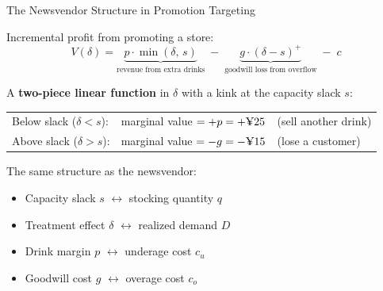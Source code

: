 \documentclass[aspectratio=169, 11pt, handout]{beamer}
\begin{document}
 
\begin{frame}{The Newsvendor Structure in Promotion Targeting}
 
Incremental profit from promoting a store:
\[
V(\delta) = \underbrace{p \cdot \min(\delta,\, s)}_{\text{revenue from extra drinks}} \;-\; \underbrace{g \cdot (\delta - s)^+}_{\text{goodwill loss from overflow}} \;-\; c
\]
 
\pause
\bigskip
 
A \textbf{two-piece linear function} in $\delta$ with a kink at the capacity slack $s$:
 
\medskip
 
\begin{center}
\begin{tabular}{lcl}
Below slack ($\delta < s$): & marginal value $= +p = +\text{\textyen}25$ & (sell another drink) \\
Above slack ($\delta > s$): & marginal value $= -g = -\text{\textyen}15$ & (lose a customer) \\
\end{tabular}
\end{center}
 
\pause
\bigskip
 
The same structure as the newsvendor:
\begin{itemize}
    \item Capacity slack $s$ $\longleftrightarrow$ stocking quantity $q$
    \item Treatment effect $\delta$ $\longleftrightarrow$ realized demand $D$
    \item Drink margin $p$ $\longleftrightarrow$ underage cost $c_u$
    \item Goodwill cost $g$ $\longleftrightarrow$ overage cost $c_o$
\end{itemize}
 
\end{frame}
 
\end{document}
